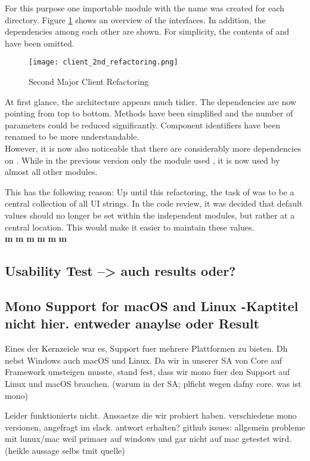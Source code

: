 For this purpose one importable module with the name  was created for each directory.
Figure \ref{fig:client_2nd_refactoring} shows an overview of the interfaces.
In addition, the dependencies among each other are shown.
For simplicity, the contents of  and  have been omitted. \\

\begin{figure}[H]
    \centering
    \texttt{[image: client\_2nd\_refactoring.png]}
    \caption{Second Major Client Refactoring}
    \label{fig:client_2nd_refactoring}
\end{figure}

At first glance, the architecture appears much tidier.
The dependencies are now pointing from top to bottom.
Methods have been simplified and the number of parameters could be reduced significantly.
Component identifiers have been renamed to be more understandable. \\

However, it is now also noticeable that there are considerably more dependencies on .
While in the previous version only the module  used , it is now used by almost all other modules.

This has the following reason: Up until this refactoring, the task of  was to be a central collection of all UI strings. 
In the code review, it was decided that default values should no longer be set within the independent modules,
but rather at a central location.
This would make it easier to maintain these values. \\



\textbf{m}
\textbf{m}
\textbf{m}
\textbf{m}
\textbf{m}
\textbf{m}



\subsection{Usability Test --> auch results oder?}


\subsection{Mono Support for macOS and Linux -Kaptitel nicht hier. entweder anaylse oder Result}
Eines der Kernzeiele war es, Support fuer mehrere Plattformen zu bieten. Dh nebst Windows auch macOS und Linux.
Da wir in unserer SA von Core auf Framework umsteigen musste, stand fest, dass wir mono fuer den Support auf Linux und macOS brauchen.
(warum in der SA; plficht wegen dafny core. was ist mono)

Leider funktionierts nicht.
Anssaetze die wir probiert haben. verschiedene mono versionen, angefragt im slack. antwort erhalten?
github issues: allgemein probleme mit lunux/mac weil primaer auf windows und gar nicht auf mac getestet wird. (heikle aussage selbs tmit quelle)

\cite{sa}
\cite{mono-slack}
\cite{mono-git}
